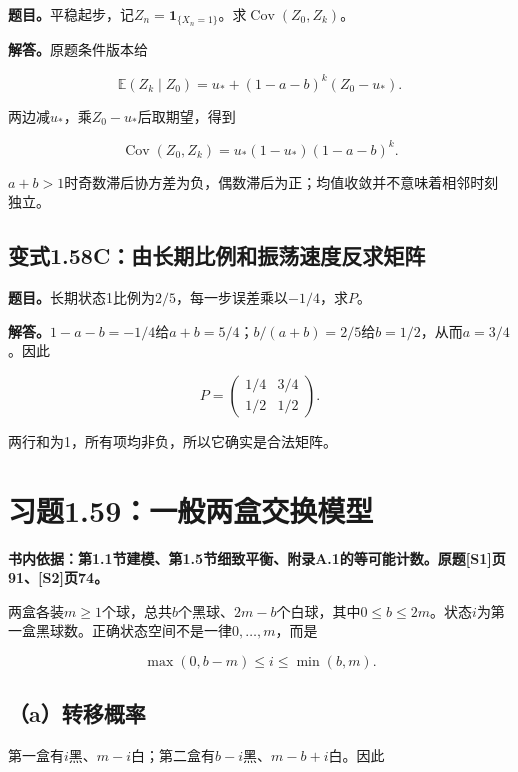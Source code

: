 \documentclass[
  11pt,a4paper,UTF8,fontset=fandol]{ctexart}
\begin{document}
\textbf{题目。}平稳起步，记\(Z_n=\mathbf1_{\{X_n=1\}}\)。求\(\operatorname{Cov}(Z_0,Z_k)\)。

\textbf{解答。}原题条件版本给

\[
\mathbb E(Z_k\mid Z_0)=u_*+(1-a-b)^k(Z_0-u_*).
\]

两边减\(u_*\)，乘\(Z_0-u_*\)后取期望，得到

\[
\boxed{\operatorname{Cov}(Z_0,Z_k)=u_*(1-u_*)(1-a-b)^k.}
\]

\(a+b>1\)时奇数滞后协方差为负，偶数滞后为正；均值收敛并不意味着相邻时刻独立。

\subsection{变式1.58C：由长期比例和振荡速度反求矩阵}\label{ux53d8ux5f0f1.58cux7531ux957fux671fux6bd4ux4f8bux548cux632fux8361ux901fux5ea6ux53cdux6c42ux77e9ux9635}

\textbf{题目。}长期状态1比例为\(2/5\)，每一步误差乘以\(-1/4\)，求\(P\)。

\textbf{解答。}\(1-a-b=-1/4\)给\(a+b=5/4\)；\(b/(a+b)=2/5\)给\(b=1/2\)，从而\(a=3/4\)。因此

\[
\boxed{P=\begin{pmatrix}1/4&3/4\\1/2&1/2\end{pmatrix}.}
\]

两行和为1，所有项均非负，所以它确实是合法矩阵。

\section{习题1.59：一般两盒交换模型}\label{ux4e60ux98981.59ux4e00ux822cux4e24ux76d2ux4ea4ux6362ux6a21ux578b}

\textbf{书内依据：第1.1节建模、第1.5节细致平衡、附录A.1的等可能计数。原题{[}S1{]}页91、{[}S2{]}页74。}

两盒各装\(m\ge1\)个球，总共\(b\)个黑球、\(2m-b\)个白球，其中\(0\le b\le2m\)。状态\(i\)为第一盒黑球数。正确状态空间不是一律\(0,\ldots,m\)，而是

\[
\boxed{\max(0,b-m)\le i\le\min(b,m).}
\]

\subsection{（a）转移概率}\label{aux8f6cux79fbux6982ux7387}

第一盒有\(i\)黑、\(m-i\)白；第二盒有\(b-i\)黑、\(m-b+i\)白。因此
\end{document}
